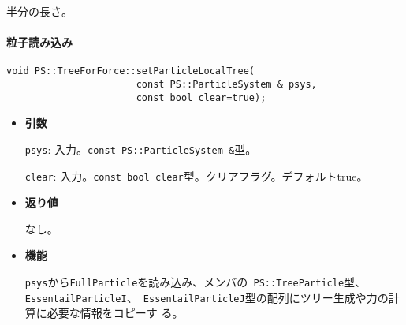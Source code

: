 


半分の長さ。







\paragraph{粒子読み込み}
\mbox{}

\begin{screen}
\begin{verbatim}
void PS::TreeForForce::setParticleLocalTree(
                       const PS::ParticleSystem & psys,
                       const bool clear=true);
\end{verbatim}
\end{screen}

\begin{itemize}

\item{{\bf 引数}}

{\tt psys}: 入力。{\tt const PS::ParticleSystem \&}型。

{\tt clear}: 入力。{\tt const bool clear}型。クリアフラグ。デフォルトtrue。

\item{{\bf 返り値}}

なし。

\item{{\bf 機能}}

{\tt psys}から{\tt FullParticle}を読み込み、メンバの{\tt
PS::TreeParticle}型、{\tt EssentailParticleI}、{\tt
EssentailParticleJ}型の配列にツリー生成や力の計算に必要な情報をコピーす
る。

\end{itemize}




